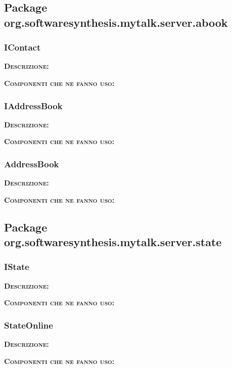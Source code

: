 \subsection{Package org.softwaresynthesis.mytalk.server.abook}
\subsubsection{IContact}
\begin{description}
	\item{\scshape\bfseries Descrizione:} 
	\item{\scshape\bfseries Componenti che ne fanno uso:} 
\end{description}

\subsubsection{IAddressBook}
\begin{description}
	\item{\scshape\bfseries Descrizione:} 
	\item{\scshape\bfseries Componenti che ne fanno uso:} 
\end{description}

\subsubsection{AddressBook}
\begin{description}
	\item{\scshape\bfseries Descrizione:} 
	\item{\scshape\bfseries Componenti che ne fanno uso:} 
\end{description}

\subsection{Package org.softwaresynthesis.mytalk.server.state}
\subsubsection{IState}
\begin{description}
	\item{\scshape\bfseries Descrizione:} 
	\item{\scshape\bfseries Componenti che ne fanno uso:} 
\end{description}

\subsubsection{StateOnline}
\begin{description}
	\item{\scshape\bfseries Descrizione:} 
	\item{\scshape\bfseries Componenti che ne fanno uso:} 
\end{description}

